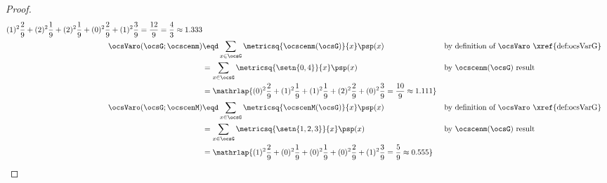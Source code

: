 \begin{tabstr}{0.75}
\begin{proof}
\begin{align*}
{           (1)^2\frac{2}{9}+  %
           (2)^2\frac{1}{9}+  %
           (2)^2\frac{1}{9}+  %
           (0)^2\frac{2}{9}+  %
           (1)^2\frac{3}{9}   %
         = \frac{12}{9} = \frac{4}{3} \approx 1.333}
      \\
      \ocsVaro(\ocsG;\ocscenm)
        &\eqd \sum_{x\in\ocsG}\metricsq{\ocscenm(\ocsG)}{x}\psp(x)
        && \text{by definition of $\ocsVaro$ \xref{def:ocsVarG}}
      \\&= \sum_{x\in\ocsG}\metricsq{\setn{0,4}}{x}\psp(x)
        && \text{by $\ocscenm(\ocsG)$ result}
      \\&= \mathrlap{
           (0)^2\frac{2}{9}+  %
           (1)^2\frac{1}{9}+  %
           (1)^2\frac{1}{9}+  %
           (2)^2\frac{2}{9}+  %
           (0)^2\frac{3}{9}   %
         = \frac{10}{9} \approx 1.111}
      \\
      \ocsVaro(\ocsG;\ocscenM)
        &\eqd \sum_{x\in\ocsG}\metricsq{\ocscenM(\ocsG)}{x}\psp(x)
        && \text{by definition of $\ocsVaro$ \xref{def:ocsVarG}}
      \\&= \sum_{x\in\ocsG}\metricsq{\setn{1,2,3}}{x}\psp(x)
        && \text{by $\ocscenm(\ocsG)$ result}
      \\&= \mathrlap{
           (1)^2\frac{2}{9}+  %
           (0)^2\frac{1}{9}+  %
           (0)^2\frac{1}{9}+  %
           (0)^2\frac{2}{9}+  %
           (1)^2\frac{3}{9}   %
         = \frac{5}{9} \approx 0.555}
    \end{align*}
\end{proof}




\end{tabstr}
